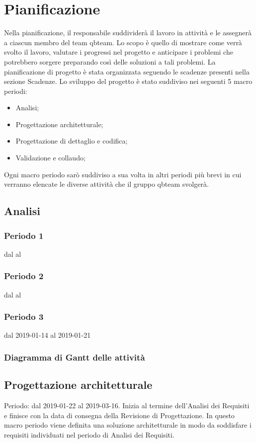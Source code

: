 \section{Pianificazione}
Nella pianificazione, il responsabile suddividerà il lavoro in attività e le assegnerà a ciascun membro del team qbteam.
Lo scopo è quello di mostrare come verrà svolto il lavoro, valutare i progressi nel progetto e anticipare i problemi che potrebbero sorgere preparando così delle soluzioni a tali problemi. 
La pianiﬁcazione di progetto è stata organizzata seguendo le scadenze presenti nella sezione Scadenze.
Lo sviluppo del progetto è stato suddiviso nei seguenti 5 macro periodi: 
\begin{itemize}
	\item Analisi;
	\item Progettazione architetturale;
	\item Progettazione di dettaglio e codifica;
	\item Validazione e collaudo;
\end{itemize}
Ogni macro periodo sarò suddiviso a sua volta in altri periodi più brevi in cui verranno elencate le diverse attività che il gruppo qbteam svolgerà.


\subsection{Analisi}

\subsubsection{Periodo 1} dal al
\subsubsection{Periodo 2} dal al
\subsubsection{Periodo 3} dal 2019-01-14 al 2019-01-21
\subsubsection{Diagramma di Gantt delle attività}


\subsection{Progettazione architetturale}
Periodo: dal 2019-01-22 al 2019-03-16.
Inizia al termine dell'Analisi dei Requisiti e finisce con la data di consegna della Revisione di Progettazione.
In questo macro periodo viene definita una soluzione architetturale in modo da soddisfare i requisiti individuati nel periodo di Analisi dei Requisiti.


